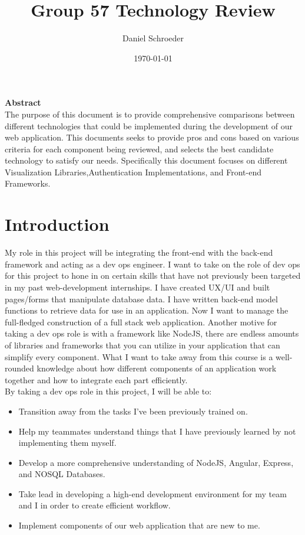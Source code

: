 \documentclass[onecolumn, draftclsnofoot,10pt, compsoc]{IEEEtran}
\title{\textbf{\CapstoneProjectName} \linebreak \LARGE{Group 57} \linebreak \LARGE{Technology Review}}
\author{Daniel Schroeder}
\date{\today}
\begin{document}
\maketitle
\vfill
\noindent \textbf{Abstract} \\
            \indent 
            The purpose of this document is to provide comprehensive comparisons between different technologies that could be implemented during the development of our web application. This documents seeks to provide pros and cons based on various criteria for each component being reviewed, and selects the best candidate technology to satisfy our needs. Specifically this document focuses on different Visualization Libraries,Authentication Implementations, and Front-end Frameworks.
            
            

\newpage
{}
\tableofcontents
\clearpage

\section{Introduction}
My role in this project will be integrating the front-end with the back-end framework and acting as a dev ops engineer. I want to take on the role of dev ops for this project to hone in on certain skills that have not previously been targeted in my past web-development internships. I have created UX/UI and built pages/forms that  manipulate database data. I have written back-end model functions to retrieve data for use in an application. Now I want to manage the full-fledged construction of a full stack web application. Another motive for taking a dev ops role is with a framework like NodeJS, there are endless amounts of libraries and frameworks that you can utilize in your application that can simplify every component. What I want to take away from this course is a well-rounded knowledge about how different components of an application work together and how to integrate each part efficiently.\\
By taking a dev ops role in this project, I will be able to:
\begin{itemize}
    \item Transition away from the tasks I've been previously trained on.
    \item Help my teammates understand things that I have previously learned by not implementing them myself.
    \item Develop a more comprehensive understanding of NodeJS, Angular, Express, and NOSQL Databases.
    \item Take lead in developing a high-end development environment for my team and I in order to create efficient workflow.
    \item Implement components of our web application that are new to me.
\end{itemize}
\end{document}
